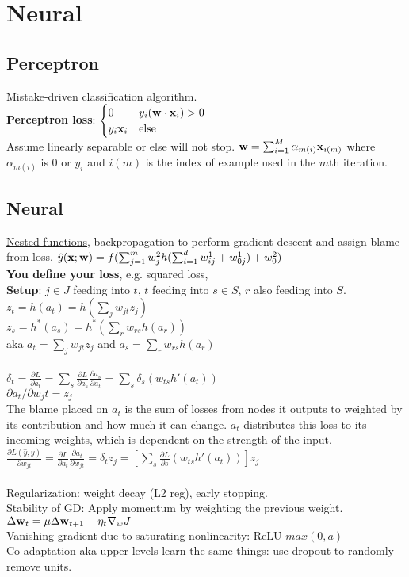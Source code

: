 \section{Neural}
\subsection{Perceptron}
Mistake-driven classification algorithm.\\
\textbf{Perceptron loss}: $\begin{cases}
0 &  y_i({\textrm{\textbf{w}}}\cdot{\textrm{\textbf{x}}}_i) > 0\\
y_i{\textrm{\textbf{x}}}_i & \textrm{else}
\end{cases}$\\
Assume linearly separable or else will not stop.
${\textrm{\textbf{w}}} = \sum_{i=1}^{M}\alpha_{m(i)}{\textrm{\textbf{x}}}_{i(m)}$ where $\alpha_{m(i)}$ is 0 or $y_i$ and $i(m)$ is the index of example used in the $m$th iteration.
\subsection{Neural}
\underline{Nested functions}, backpropagation to perform gradient descent and assign blame from loss.
$\hat{y}({\textrm{\textbf{x}}}; {\textrm{\textbf{w}}}) = f(\sum_{j=1}^{m}w_j^{2}h(\sum_{i=1}^{d}w_{ij}^{1} + w_{0j}^{1}) + w_0^2)$\\
\textbf{You define your loss}, e.g. squared loss,\\
\textbf{Setup}: $j \in J$ feeding into $t$, $t$ feeding into $s \in S$, $r$ also feeding into $S$.\\
$z_t = h(a_t) = h(\sum_{j} w_{jt}z_j)$\\
$z_s = h^*(a_s) = h^*(\sum_{r}w_{rs}h(a_r))$\\
aka $a_t = \sum_{j} w_{jt}z_j$ and $a_s = \sum_{r}w_{rs}h(a_r)$\\\\
$\delta_t = \frac{\partial L}{\partial a_{t}} = \sum_{s} \frac{\partial L}{ \partial a_s}\frac{\partial a_s}{ \partial a_t} = \sum_{s} \delta_s(w_{ts}h'(a_t))$\\
$\partial a_t / \partial w_jt = z_j$\\
The blame placed on $a_t$ is the sum of losses from nodes it outputs to weighted by its contribution and how much it can change. $a_t$ distributes this loss to its incoming weights, which is dependent on the strength of the input.\\
$\frac{\partial L(\hat{y}, y)}{\partial w_{jt}} = \frac{\partial L}{\partial a_t} \frac{\partial a_t}{\partial w_{jt}} = \delta_t z_j = [\sum_{s} \frac{\partial L}{\partial s}(w_{ts}h'(a_t)) ]z_j$\\\\
Regularization: 
weight decay (L2 reg), early stopping.\\
Stability of GD: Apply momentum by weighting the previous weight. $\Delta {\textrm{\textbf{w}}}_t = \mu \Delta {\textrm{\textbf{w}}}_{t+1} - \eta_t \nabla_w J$\\
Vanishing gradient due to saturating nonlinearity: ReLU $max(0, a)$\\
Co-adaptation aka upper levels learn the same things: use dropout to randomly remove units.
